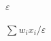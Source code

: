 \documentclass{article}
\begin{document}
$\varepsilon$
\pagebreak

$\sum w_i x_i / \varepsilon$
\pagebreak
\end{document}
